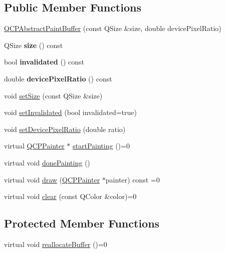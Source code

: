 \subsection*{Public Member Functions}
\begin{DoxyCompactItemize}
\item 
\hyperlink{classQCPAbstractPaintBuffer_a3ce532c12f10b81697108835755641e2}{Q\+C\+P\+Abstract\+Paint\+Buffer} (const Q\+Size \&size, double device\+Pixel\+Ratio)
\item 
Q\+Size {\bfseries size} () const \hypertarget{classQCPAbstractPaintBuffer_aad79fd72221e4614a771c03985798d9b}{}\label{classQCPAbstractPaintBuffer_aad79fd72221e4614a771c03985798d9b}

\item 
bool {\bfseries invalidated} () const \hypertarget{classQCPAbstractPaintBuffer_a4b8de01a2485c2bf8e98fdbec7f0bcc6}{}\label{classQCPAbstractPaintBuffer_a4b8de01a2485c2bf8e98fdbec7f0bcc6}

\item 
double {\bfseries device\+Pixel\+Ratio} () const \hypertarget{classQCPAbstractPaintBuffer_a107d55bb234b5d19651157071d3b2c37}{}\label{classQCPAbstractPaintBuffer_a107d55bb234b5d19651157071d3b2c37}

\item 
void \hyperlink{classQCPAbstractPaintBuffer_a8b68c3cd36533f1a4a23b5ce8cd66f01}{set\+Size} (const Q\+Size \&size)
\item 
void \hyperlink{classQCPAbstractPaintBuffer_ae4c7dc70dfc66be2879ce297b2b3d67f}{set\+Invalidated} (bool invalidated=true)
\item 
void \hyperlink{classQCPAbstractPaintBuffer_a555eaad5d5c806420ff35602a1bb68fa}{set\+Device\+Pixel\+Ratio} (double ratio)
\item 
virtual \hyperlink{classQCPPainter}{Q\+C\+P\+Painter} $\ast$ \hyperlink{classQCPAbstractPaintBuffer_a9e9f29b19c033cf02fb96f1a148463f3}{start\+Painting} ()=0
\item 
virtual void \hyperlink{classQCPAbstractPaintBuffer_a41b0dc6e7744f19fae09f8532c207dc1}{done\+Painting} ()
\item 
virtual void \hyperlink{classQCPAbstractPaintBuffer_afb998c7525e3ae37d9d2d46c7aaf461a}{draw} (\hyperlink{classQCPPainter}{Q\+C\+P\+Painter} $\ast$painter) const =0
\item 
virtual void \hyperlink{classQCPAbstractPaintBuffer_a9e253f4541dfc01992b77e8830bd7722}{clear} (const Q\+Color \&color)=0
\end{DoxyCompactItemize}
\subsection*{Protected Member Functions}
\begin{DoxyCompactItemize}
\item 
virtual void \hyperlink{classQCPAbstractPaintBuffer_aee7506a52bd7e5a07c2af27935eb13e7}{reallocate\+Buffer} ()=0
\end{DoxyCompactItemize}
